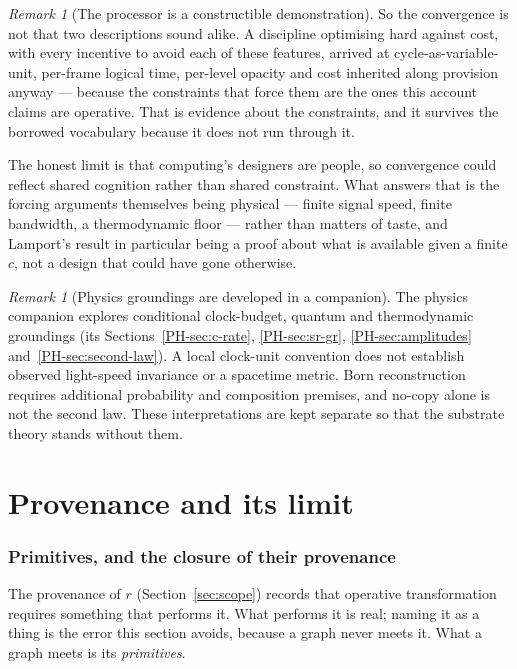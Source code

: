 \documentclass[11pt,a4paper]{article}
\theoremstyle{remark}\newtheorem{remark}[definition]{Remark}
\begin{document}
\begin{remark}[The processor is a constructible demonstration]
So the convergence is not that two descriptions sound alike. A discipline optimising hard against
cost, with every incentive to avoid each of these features, arrived at cycle-as-variable-unit,
per-frame logical time, per-level opacity and cost inherited along provision anyway --- because the
constraints that force them are the ones this account claims are operative. That is evidence about the
constraints, and it survives the borrowed vocabulary because it does not run through it.

The honest limit is that computing's designers are people, so convergence could reflect shared cognition rather than shared constraint. What answers that is the forcing arguments themselves being physical --- finite signal speed, finite bandwidth, a thermodynamic floor --- rather than matters of taste, and Lamport's result in particular being a proof about what is available given a finite $c$, not a design that could have gone otherwise.

\end{remark}

\begin{remark}[Physics groundings are developed in a companion]\label{rem:physics-companion}
The physics companion explores conditional clock-budget, quantum and thermodynamic groundings (its Sections~\ref{PH-sec:c-rate}, \ref{PH-sec:sr-gr}, \ref{PH-sec:amplitudes} and~\ref{PH-sec:second-law}). A local clock-unit convention does not establish observed light-speed invariance or a spacetime metric. Born reconstruction requires additional probability and composition premises, and no-copy alone is not the second law. These interpretations are kept separate so that the substrate theory stands without them.
\end{remark}

\part{Provenance and its limit}
\section{Primitives, and the closure of their provenance}\label{sec:rule-runner}

The provenance of $r$ (Section~\ref{sec:scope}) records that operative transformation requires something that performs it. What performs it is real; naming it as a thing is the error this section avoids, because a graph never meets it. What a graph meets is its \emph{primitives}.
\end{document}
